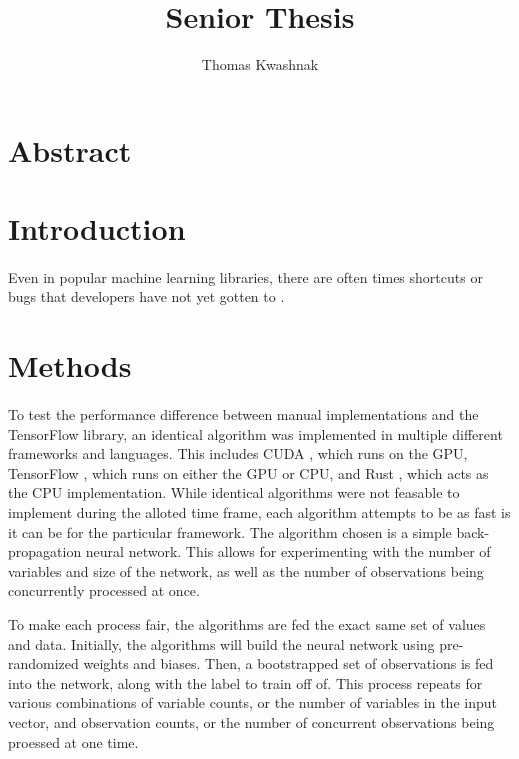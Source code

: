 \documentclass[12pt]{article}
\author{Thomas Kwashnak}
\title{Senior Thesis}
\begin{document}
\maketitle

\newpage

\newpage

\section{Abstract}

\section{Introduction}


\paragraph{}
Even in popular machine learning libraries, there are often times shortcuts or bugs that developers have not yet gotten to \cite{article_deep_learning_framework_debt}.


\section{Methods}

\paragraph{} 
To test the performance difference between manual implementations and the TensorFlow library, an identical algorithm was implemented in multiple different frameworks and languages.
This includes CUDA \cite{lib_cuda}, which runs on the GPU, TensorFlow \cite{lib_tensorflow}, which runs on either the GPU or CPU, and Rust \cite{lang_rust}, which acts as the CPU implementation.
While identical algorithms were not feasable to implement during the alloted time frame, each algorithm attempts to be as fast is it can be for the particular framework.
The algorithm chosen is a simple back-propagation neural network.
This allows for experimenting with the number of variables and size of the network, as well as the number of observations being concurrently processed at once.

To make each process fair, the algorithms are fed the exact same set of values and data.
Initially, the algorithms will build the neural network using pre-randomized weights and biases.
Then, a bootstrapped set of observations is fed into the network, along with the label to train off of.
This process repeats for various combinations of variable counts, or the number of variables in the input vector, and observation counts, or the number of concurrent observations being proessed at one time.
\end{document}
